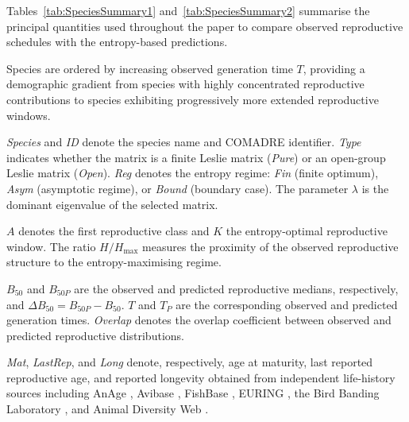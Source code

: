 \documentclass[10pt,a4paper]{amsart}
\theoremstyle{definition}
\theoremstyle{remark}
\numberwithin{equation}{section}
\begin{document}
Tables~\ref{tab:SpeciesSummary1} and~\ref{tab:SpeciesSummary2}
summarise the principal quantities used throughout the paper to compare
observed reproductive schedules with the entropy-based predictions.

Species are ordered by increasing observed generation time
\(T\), providing a demographic gradient from species with highly
concentrated reproductive contributions to species exhibiting
progressively more extended reproductive windows.


\textit{Species} and \textit{ID} denote the species name and COMADRE
identifier. \textit{Type} indicates whether the matrix is a finite
Leslie matrix (\textit{Pure}) or an open-group Leslie matrix
(\textit{Open}). \textit{Reg} denotes the entropy regime:
\textit{Fin} (finite optimum), \textit{Asym} (asymptotic regime), or
\textit{Bound} (boundary case). The parameter \(\lambda\) is the
dominant eigenvalue of the selected matrix.

\(A\) denotes the first reproductive class and \(K\) the
entropy-optimal reproductive window. The ratio \(H/H_{\max}\)
measures the proximity of the observed reproductive structure to the
entropy-maximising regime.

\(B_{50}\) and \(B_{50P}\) are the observed and predicted
reproductive medians, respectively, and
\(\Delta B_{50}=B_{50P}-B_{50}\).
\(T\) and \(T_P\) are the corresponding observed and predicted generation times. \textit{Overlap} denotes the overlap coefficient
between observed and predicted reproductive 
distributions.

\textit{Mat}, \textit{LastRep}, and \textit{Long} denote,
respectively, age at maturity, last reported reproductive age, and
reported longevity obtained from independent life-history sources
including AnAge \cite{Tacutu2018}, Avibase \cite{Lepage2024},
FishBase \cite{FroesePauly2024}, EURING \cite{EURING2024}, the Bird
Banding Laboratory \cite{BBL2024}, and Animal Diversity Web
\cite{ADW2024}.
\end{document}
